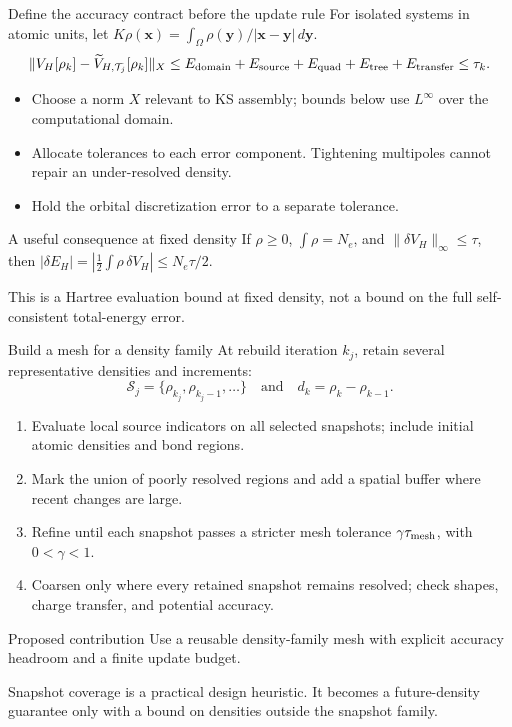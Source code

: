 \documentclass[aspectratio=169,10pt]{beamer}
\begin{document}
\begin{frame}{Define the accuracy contract before the update rule}
\small For isolated systems in atomic units, let $K\rho(\bm x)=\int_\Omega\rho(\bm y)/|\bm x-\bm y|\,d\bm y$.
\[
\|V_H[\rho_k]-\widetilde V_{H,\mathcal T_j}[\rho_k]\|_X
\le E_{\rm domain}+E_{\rm source}+E_{\rm quad}
+E_{\rm tree}+E_{\rm transfer}\le\tau_k.
\]
\begin{itemize}
\item Choose a norm $X$ relevant to KS assembly; bounds below use $L^\infty$ over the computational domain.
\item Allocate tolerances to each error component. Tightening multipoles cannot repair an under-resolved density.
\item Hold the orbital discretization error to a separate tolerance.
\end{itemize}
\begin{block}{A useful consequence at fixed density}
If $\rho\ge0$, $\int\rho=N_e$, and $\|\delta V_H\|_\infty\le\tau$, then
$|\delta E_H|=|\tfrac12\int\rho\,\delta V_H|\le N_e\tau/2$.
\end{block}
\footnotesize This is a Hartree evaluation bound at fixed density, not a bound on the full self-consistent total-energy error.
\end{frame}

\begin{frame}{Build a mesh for a density family}
\small At rebuild iteration $k_j$, retain several representative densities and increments:
\[
\mathcal S_j=\{\rho_{k_j},\rho_{k_j-1},\ldots\}
\quad\text{and}\quad d_k=\rho_k-\rho_{k-1}.
\]
\begin{enumerate}
\item Evaluate local source indicators on all selected snapshots; include initial atomic densities and bond regions.
\item Mark the union of poorly resolved regions and add a spatial buffer where recent changes are large.
\item Refine until each snapshot passes a stricter mesh tolerance $\gamma\tau_{\rm mesh}$, with $0<\gamma<1$.
\item Coarsen only where every retained snapshot remains resolved; check shapes, charge transfer, and potential accuracy.
\end{enumerate}
\begin{block}{Proposed contribution}
Use a reusable density-family mesh with explicit accuracy headroom and a finite update budget.
\end{block}
\footnotesize Snapshot coverage is a practical design heuristic. It becomes a future-density guarantee only with a bound on densities outside the snapshot family.
\end{frame}
\end{document}
